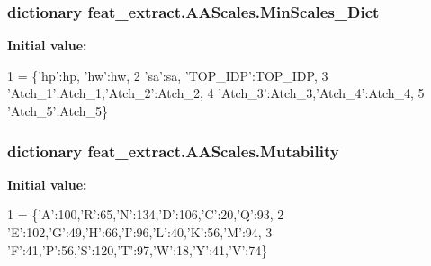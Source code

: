 \subsubsection[{Min\+Scales\+\_\+\+Dict}]{\setlength{\rightskip}{0pt plus 5cm}dictionary feat\+\_\+extract.\+A\+A\+Scales.\+Min\+Scales\+\_\+\+Dict}\label{namespacefeat__extract_1_1_a_a_scales_a3b23fb49b090bb6dedcc1fc54d1faf12}
{\bfseries Initial value\+:}
\begin{DoxyCode}
1 = \{\textcolor{stringliteral}{'hp'}:hp, \textcolor{stringliteral}{'hw'}:hw,
2         \textcolor{stringliteral}{'sa'}:sa, \textcolor{stringliteral}{'TOP\_IDP'}:TOP\_IDP,
3                   \textcolor{stringliteral}{'Atch\_1'}:Atch\_1,\textcolor{stringliteral}{'Atch\_2'}:Atch\_2,
4                   \textcolor{stringliteral}{'Atch\_3'}:Atch\_3,\textcolor{stringliteral}{'Atch\_4'}:Atch\_4,
5                   \textcolor{stringliteral}{'Atch\_5'}:Atch\_5\}
\end{DoxyCode}
\hypertarget{namespacefeat__extract_1_1_a_a_scales_a2367318b4c6943ad9694b34dcf111296}{}
\subsubsection[{Mutability}]{\setlength{\rightskip}{0pt plus 5cm}dictionary feat\+\_\+extract.\+A\+A\+Scales.\+Mutability}\label{namespacefeat__extract_1_1_a_a_scales_a2367318b4c6943ad9694b34dcf111296}
{\bfseries Initial value\+:}
\begin{DoxyCode}
1 = \{\textcolor{stringliteral}{'A'}:100,\textcolor{stringliteral}{'}\textcolor{stringliteral}{R':65,'}N':134,'D':106,'C':20,'Q':93,
2                                          \textcolor{stringliteral}{'E'}:102,\textcolor{stringliteral}{'G'}:49,\textcolor{stringliteral}{'H'}:66,\textcolor{stringliteral}{'I'}:96,\textcolor{stringliteral}{'L'}:40,\textcolor{stringliteral}{'K'}:56,\textcolor{stringliteral}{'M'}:94,
3                                           \textcolor{stringliteral}{'F'}:41,\textcolor{stringliteral}{'P'}:56,\textcolor{stringliteral}{'S'}:120,\textcolor{stringliteral}{'T'}:97,\textcolor{stringliteral}{'W'}:18,\textcolor{stringliteral}{'Y'}:41,\textcolor{stringliteral}{'V'}:74\}
\end{DoxyCode}
\hypertarget{namespacefeat__extract_1_1_a_a_scales_ae880e24690afc4f1d81df451fd6a894e}{}
